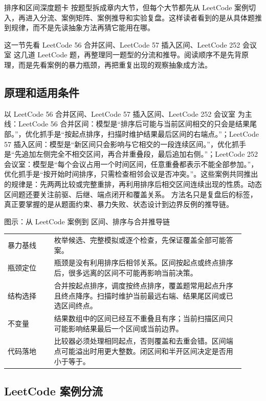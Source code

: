 排序和区间深度题卡 按题型拆成章内大节，但每个大节都先从 LeetCode 案例切入，再进入分流、案例矩阵、案例推导和实验复盘。这样读者看到的是从具体题推到规律，而不是先读抽象方法再猜它能用在哪。

这一节先看 LeetCode 56 合并区间、LeetCode 57 插入区间、LeetCode 252 会议室 这几道 LeetCode 题，再整理同一题型的分流和推导。阅读顺序不是先背原理，而是先看案例的暴力瓶颈，再把重复出现的观察抽象成方法。

\subsection{原理和适用条件}

以 LeetCode 56 合并区间、LeetCode 57 插入区间、LeetCode 252 会议室 为主线：LeetCode 56 合并区间：模型是“排序后可能与当前区间相交的只会是结果尾部。”，优化抓手是“按起点排序，扫描时维护结果最后区间的右端点。”；LeetCode 57 插入区间：模型是“新区间只会影响与它相交的一段连续区间。”，优化抓手是“先追加左侧完全不相交区间，再合并重叠段，最后追加右侧。”；LeetCode 252 会议室：模型是“每个会议占用一个时间区间，任意重叠都表示不能全部参加。”，优化抓手是“按开始时间排序，只需检查相邻会议是否冲突。”。这些案例共同推出的规律是：先两两比较或完整重排，再利用排序后相交区间连续出现的性质。动态区间题还要关注前驱、后继、端点闭开和覆盖关系。 方法名只是复盘后的标签，真正要掌握的是从题面约束、暴力失败、状态设计到边界反例的推导链。

\begin{principlebox}{图示：从 LeetCode 案例到 区间、排序与合并推导链}
\begin{tabular}{@{}p{0.18\linewidth}p{0.74\linewidth}@{}}
暴力基线 & 枚举候选、完整模拟或逐个检查，先保证覆盖全部可能答案。\\
瓶颈定位 & 瓶颈是没有利用排序后相邻关系。区间按起点或终点排序后，很多远离的区间不可能再影响当前决策。\\
结构选择 & 合并按起点排序，调度按终点排序，覆盖题常用起点升序且终点降序。扫描时维护当前最远右端、结果尾区间或已选区间终点。\\
不变量 & 结果数组中的区间已经互不重叠且有序；当前扫描区间只可能影响结果最后一个区间或当前边界。\\
代码落地 & 比较器必须处理相同起点，否则覆盖和去重会错。区间端点可能溢出时用更大整数。闭区间和半开区间决定是否用小于等于。\\
\end{tabular}
\end{principlebox}

\subsection{LeetCode 案例分流}

